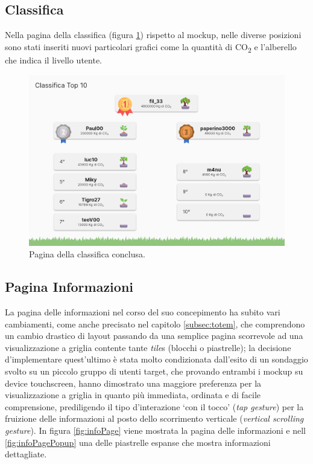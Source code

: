 \subsection{Classifica}
Nella pagina della classifica (figura \ref{fig:top10screen}) rispetto al mockup, nelle diverse posizioni sono stati inseriti nuovi particolari grafici come la quantità di CO\textsubscript{2} e l'alberello che indica il livello utente.
\begin{figure}[h]
  \centering
  \includegraphics[width=\textwidth]{img/totem/screenshot/top10screen.png}
  \caption{Pagina della classifica conclusa.}
  \label{fig:top10screen}
\end{figure}

%
%
\subsection{Pagina Informazioni}
La pagina delle informazioni nel corso del suo concepimento ha subito vari cambiamenti, come anche precisato nel capitolo \ref{subsec:totem}, che comprendono un cambio drastico di layout passando da una semplice pagina scorrevole ad una visualizzazione a griglia contente tante \textit{tile}s (blocchi o piastrelle); la decisione d'implementare quest'ultimo è stata molto condizionata dall'esito di un sondaggio svolto su un piccolo gruppo di utenti target, che provando entrambi i mockup su device touchscreen, hanno dimostrato una maggiore preferenza per la visualizzazione a griglia in quanto più immediata, ordinata e di facile comprensione, prediligendo il tipo d'interazione \enquote*{con il tocco} (\textit{tap gesture}) per la fruizione delle informazioni al posto dello scorrimento verticale (\textit{vertical scrolling gesture}). In figura \ref{fig:infoPage} viene mostrata la pagina delle informazioni e nell \ref{fig:infoPagePopup} una delle piastrelle espanse che mostra informazioni dettagliate.

